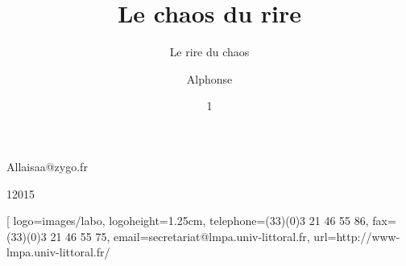 \documentclass[12pt,space=onehalf]{yathesis}
\begin{document}
%
%
%
\author{Alphonse}{Allais}{aa@zygo.fr}
%
\title[Laugh's Chaos]{Le chaos du rire}
%
\subtitle[Chaos' laugh]{Le rire du chaos}
%
%
%
\date{1}{1}{2015}
%
\subject[Chaotic Laugh]{Rire chaotique}
%
%
%
%
%
%
\laboratory[
logo=images/labo,
logoheight=1.25cm,
telephone=(33)(0)3 21 46 55 86,
fax=(33)(0)3 21 46 55 75,
email=secretariat@lmpa.univ-littoral.fr,
url=http://www-lmpa.univ-littoral.fr/
\end{document}
